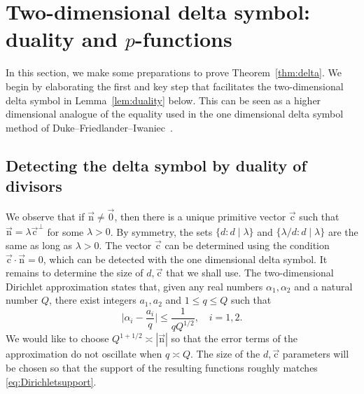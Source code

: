 \documentclass[letterpaper,11pt]{amsart}
\numberwithin{equation}{section}
\theoremstyle{definition}
\numberwithin{equation}{section}
\newcommand{\uc}{{\vec{\mathrm{c}}}}
\newcommand{\nn}{\vec{\mathrm{n}}}
\begin{document}
\section{Two-dimensional delta symbol: duality and \texorpdfstring{$p$}{p}-functions}\label{sec:setup}
In this section, we make some preparations to prove Theorem~\ref{thm:delta}.
We begin by elaborating the first and key step that facilitates the two-dimensional delta symbol in Lemma~\ref{lem:duality} below. This can be seen as a higher dimensional analogue of the equality used in the one dimensional delta symbol method of Duke--Friedlander--Iwaniec~\cite[(2.3)]{DFI}. 


\subsection{Detecting the delta symbol by duality of divisors}

We observe that if $\nn\not=\vec{0}$, then there is a unique primitive vector $\uc$ such that $\nn=\lambda\uc^\perp$ for some $\lambda>0$. By symmetry, the sets 
$\{d:d\mid \lambda\}$ and $\{\lambda/d: d\mid \lambda\}$ are the same as long as $\lambda>0$. The vector $\uc$ can be determined using the condition $\uc\cdot \nn=0$, which can be detected with the one dimensional delta symbol. It remains to determine the size of $d, \uc$ that we shall use. 
  The  two-dimensional Dirichlet approximation states that, given any real numbers $\alpha_1, \alpha_2$ and a natural number $Q$, there exist integers $a_1, a_2$ and $1\leq q\leq Q$ such that 
  \begin{equation}\label{eq:Dirichletsupport}
         \Big|\alpha_i-\frac{a_i}{q}\Big|\leq \frac{1}{q Q^{1/2}}, \quad i=1,2.
  \end{equation}
  We would like to choose $Q^{1+1/2}\asymp |\nn|$ so that the error terms of the approximation do not oscillate when $q\asymp Q$. 
  The size of the $d, \uc$ parameters will be chosen so that the support of the resulting functions roughly matches \eqref{eq:Dirichletsupport}.   
\end{document}
